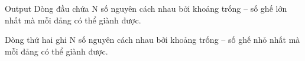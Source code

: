 Output
Dòng đầu chứa N số nguyên cách nhau bởi khoảng trống – số ghế lớn nhất mà mỗi đảng có thể giành được.  

   Dòng thứ hai ghi N số nguyên cách nhau bởi khoảng trống – số ghế nhỏ nhất mà mỗi đảng có thể giành được.